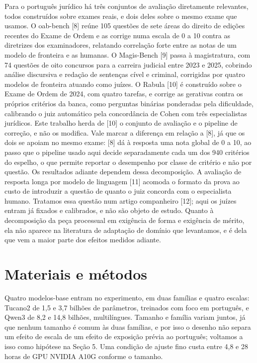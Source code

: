 \documentclass{IOS-Book-Article}
\begin{document}
Para o português jurídico há três conjuntos de avaliação diretamente relevantes, todos construídos sobre exames reais, e dois deles sobre o mesmo exame que usamos. O oab-bench [8] reúne 105 questões de sete áreas do direito de edições recentes do Exame de Ordem e as corrige numa escala de 0 a 10 contra as diretrizes dos examinadores, relatando correlação forte entre as notas de um modelo de fronteira e as humanas. O Magis-Bench [9] passa à magistratura, com 74 questões de oito concursos para a carreira judicial entre 2023 e 2025, cobrindo análise discursiva e redação de sentenças cível e criminal, corrigidas por quatro modelos de fronteira atuando como juízes. O Rabula [10] é construído sobre o Exame de Ordem de 2024, com quatro tarefas, e corrige as gerativas contra os próprios critérios da banca, como perguntas binárias ponderadas pela dificuldade, calibrando o juiz automático pela concordância de Cohen com três especialistas jurídicos.
Este trabalho herda de [10] o conjunto de avaliação e o pipeline de correção, e não os modifica. Vale marcar a diferença em relação a [8], já que os dois se apoiam no mesmo exame: [8] dá à resposta uma nota global de 0 a 10, ao passo que o pipeline usado aqui decide separadamente cada um dos 940 critérios do espelho, o que permite reportar o desempenho por classe de critério e não por questão. Os resultados adiante dependem dessa decomposição.
A avaliação de resposta longa por modelo de linguagem [11] acomoda o formato da prova ao custo de introduzir a questão de quanto o juiz concorda com o especialista humano. Tratamos essa questão num artigo companheiro [12]; aqui os juízes entram já fixados e calibrados, e não são objeto de estudo. Quanto à decomposição da peça processual em exigência de forma e exigência de mérito, ela não aparece na literatura de adaptação de domínio que levantamos, e é dela que vem a maior parte dos efeitos medidos adiante.
\section{Materiais e métodos}
Quatro modelos-base entram no experimento, em duas famílias e quatro escalas: Tucano2 de 1,5 e 3,7 bilhões de parâmetros, treinados com foco em português, e Qwen3 de 8,2 e 14,8 bilhões, multilíngues. Tamanho e família variam juntos, já que nenhum tamanho é comum às duas famílias, e por isso o desenho não separa um efeito de escala de um efeito de exposição prévia ao português; voltamos a isso como hipótese na Seção 5. Uma condição de ajuste fino custa entre 4,8 e 28 horas de GPU NVIDIA A10G conforme o tamanho.
\end{document}
